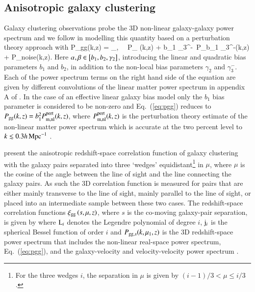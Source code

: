 \subsection{Anisotropic galaxy clustering}
\label{sec:clustering}
Galaxy clustering observations probe the 3D non-linear galaxy-galaxy power spectrum and we follow \citet{sanchez/etal:2017} in modelling this quantity based on a perturbation theory approach with
\be
\label{eq:pgg}
P_{\rm gg}(k,z) = \sum_{\alpha,\beta} \alpha\, \beta\, P_{\alpha
  \beta}(k,z) + b_1 \gamma_3^-\, P_{b_1 \gamma_3^-}(k,z) + P_{\rm noise}(k,z)\;.
\ee
Here $\alpha,\beta \in \left[ b_1, b_2, \gamma_2 \right]$, introducing the linear and quadratic bias parameters $b_1$ and $b_2$, in addition to the non-local bias parameters $ \gamma_2$ and $\gamma_3^-$.  Each of the power spectrum terms on the right hand side of the equation are given by different convolutions of the linear matter power spectrum in appendix A of \citet{sanchez/etal:2017}.   In the case of an effective linear galaxy bias model \citep[see for example][]{vanuitert/etal:2018, abbott/etal:2018} only the $b_1$ bias parameter is considered to be non-zero and Eq.~(\ref{eq:pgg}) reduces to $P_{\rm gg}(k,z) =b_1^2 P_{\rm m, nl}^{\rm pert}(k,z)$, where $P_{\rm m, nl}^{\rm pert}(k,z)$ is the perturbation theory estimate of the non-linear matter power spectrum which is accurate at the two percent level to $k \lesssim 0.3 h \,{\rm Mpc}^{-1}$ \citep{sanchez/etal:2017}. 

\citet{sanchez/etal:2017} present the anisotropic redshift-space correlation function of galaxy clustering with the galaxy pairs separated into three `wedges' equidistant\footnote{For the three wedges $i$, the separation in $\mu$ is given by $(i-1)/3 < \mu \leq i/3$.} in $\mu$, where $\mu$ is the cosine of the angle between the line of sight and the line connecting the galaxy pairs.   As such the 3D correlation function is measured for pairs that are either mainly transverse to the line of sight, mainly parallel to the line of sight, or placed into an intermediate sample between these two cases.  The redshift-space correlation functions $\xi_{\rm gg} \left( s,\mu,z \right)$, where $s$ is the co-moving galaxy-pair separation, is given by
where ${\rm L}_i$ denotes the Legendre polynomial of degree $i$, ${\rm j}_i$ is the spherical Bessel function of order $i$ and $P_{{\rm gg}, s}(k,\mu_1,z)$ is the 3D redshift-space power spectrum that includes the non-linear real-space power spectrum, Eq.~(\ref{eq:pgg}), and the galaxy-velocity and velocity-velocity power spectrum \citep[see][for details, including how the Alcock-Paczynski distortions are accounted for in the modelling]{sanchez/etal:2017}.   

